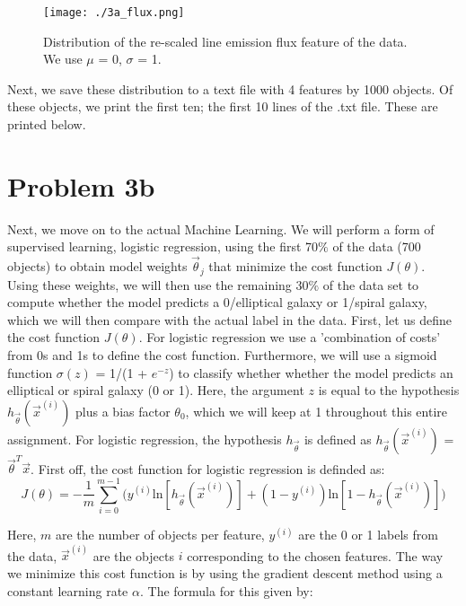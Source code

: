 \begin{figure}[h!]
  \centering
  \texttt{[image: ./3a\_flux.png]}
  \caption{Distribution of the re-scaled line emission flux feature of the data. We use $\mu$ = 0, $\sigma$ = 1.}
\end{figure}

\clearpage

Next, we save these distribution to a text file with 4 features by 1000 objects. Of these objects, we print the first ten; the first 10 lines of the .txt file. These are printed below. 



\newpage

\section*{Problem 3b}

Next, we move on to the actual Machine Learning. We will perform a form of supervised learning, logistic regression, using the first 70$\%$ of the data (700 objects) to obtain model weights $\vec{\theta}_j$ that minimize the cost function $J(\theta)$. Using these weights, we will then use the remaining 30$\%$ of the data set to compute whether the model predicts a 0/elliptical galaxy or 1/spiral galaxy, which we will then compare with the actual label in the data. First, let us define the cost function $J(\theta)$. For logistic regression we use a 'combination of costs' from 0s and 1s to define the cost function. Furthermore, we will use a sigmoid function $\sigma(z)$ = 1/(1 + $e^{-z}$) to classify whether whether the model predicts an elliptical or spiral galaxy (0 or 1). Here, the argument $z$ is equal to the hypothesis $h_{\vec{\theta}}(\vec{x}^{(i)})$ plus a bias factor $\theta_0$, which we will keep at 1 throughout this entire assignment. For logistic regression, the hypothesis $h_{\vec{\theta}}$ is defined as $h_{\vec{\theta}}(\vec{x}^{(i)})$ = $\vec{\theta}^T \vec{x}$. First off, the cost function for logistic regression is definded as:\\

\begin{equation}
J(\theta) = -\frac{1}{m} \sum_{i=0}^{m-1} \Big( y^{(i)} \text{ln}[h_{\vec{\theta}}(\vec{x}^{(i)})] + (1 - y^{(i)}) \text{ln} [1 - h_{\vec{\theta}}(\vec{x}^{(i)})]\Big)
\end{equation}

Here, $m$ are the number of objects per feature, $y^{(i)}$ are the 0 or 1 labels from the data, $\vec{x}^{(i)}$ are the objects $i$ corresponding to the chosen features. The way we minimize this cost function is by using the gradient descent method using a constant learning rate $\alpha$. The formula for this given by:\\

